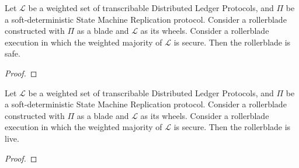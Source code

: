 \begin{theorem}[Safety]
      Let $\mathcal{L}$ be a weighted set of transcribable Distributed Ledger Protocols,
      and $\Pi$ be a soft-deterministic State Machine Replication protocol.
      Consider a rollerblade constructed with $\Pi$ as a blade and
      $\mathcal{L}$ as its wheels.
      Consider a rollerblade execution in which the weighted majority of $\mathcal{L}$
      is secure.
      Then the rollerblade is safe.
\end{theorem}
\begin{proof}
\end{proof}

\begin{theorem}[Liveness]
      Let $\mathcal{L}$ be a weighted set of transcribable Distributed Ledger Protocols,
      and $\Pi$ be a soft-deterministic State Machine Replication protocol.
      Consider a rollerblade constructed with $\Pi$ as a blade and
      $\mathcal{L}$ as its wheels.
      Consider a rollerblade execution in which the weighted majority of $\mathcal{L}$
      is secure.
      Then the rollerblade is live.
\end{theorem}
\begin{proof}
\end{proof}
